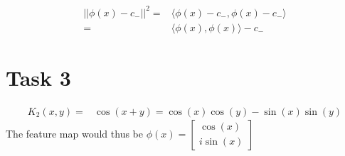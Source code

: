 \documentclass{article}
\begin{document}
\begin{align}
	||\phi(x) - c_-||^2 =& \langle \phi(x) - c_-, \phi(x) - c_- \rangle \\
	=& \langle \phi(x), \phi(x) \rangle - c_-
\end{align}

\section*{Task 3}
\begin{align}
	K_2(x,y) =& \cos(x+y) = \cos(x)\cos(y) - \sin(x)\sin(y)
\end{align}
The feature map would thus be $\phi(x) = \begin{bmatrix}\cos(x) \\ i \sin(x)\end{bmatrix}$
\end{document}
